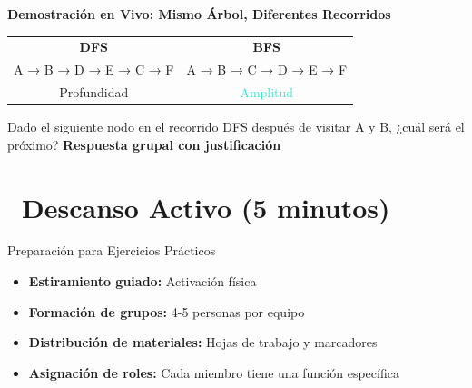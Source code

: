 \documentclass[12pt,a4paper]{article}
\begin{document}
	\begin{center}
		\textbf{\Large Demostración en Vivo: Mismo Árbol, Diferentes Recorridos}
	\end{center}
	
	\begin{center}
	\end{center}
	
	\begin{center}
		\begin{tabular}{c|c}
			\textbf{DFS} & \textbf{BFS} \\
			A → B → D → E → C → F & A → B → C → D → E → F \\
			\textcolor{primaryblue}{Profundidad} & \textcolor{turquoise}{Amplitud}
		\end{tabular}
	\end{center}
	
	Dado el siguiente nodo en el recorrido DFS después de visitar A y B, ¿cuál será el próximo?
	\textbf{Respuesta grupal con justificación}
	
	\newpage
	
	\section*{\faCoffee\ Descanso Activo (5 minutos)}
	
	\begin{activitybox}{Preparación para Ejercicios Prácticos}
		\begin{itemize}
			\item \textbf{Estiramiento guiado:} Activación física
			\item \textbf{Formación de grupos:} 4-5 personas por equipo
			\item \textbf{Distribución de materiales:} Hojas de trabajo y marcadores
			\item \textbf{Asignación de roles:} Cada miembro tiene una función específica
		\end{itemize}
	\end{activitybox}
	
\end{document}
